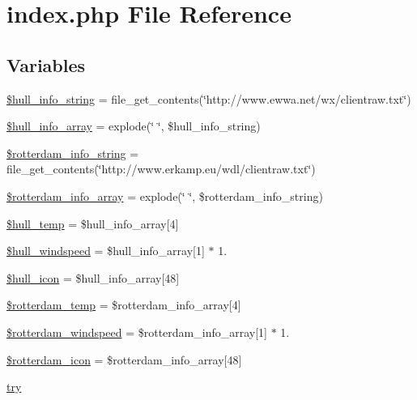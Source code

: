 \hypertarget{index_8php}{}\section{index.\+php File Reference}
\label{index_8php}
\subsection*{Variables}
\begin{DoxyCompactItemize}
\item 
\mbox{\hyperlink{index_8php_a35ce57643e0a8f4a8bb0c194778fb4e9}{\$hull\+\_\+info\+\_\+string}} = file\+\_\+get\+\_\+contents(\char`\"{}http\+://www.\+ewwa.\+net/wx/clientraw.\+txt\char`\"{})
\item 
\mbox{\hyperlink{index_8php_a22d0d905fd4a2f3daae7d36a5527a775}{\$hull\+\_\+info\+\_\+array}} = explode(\char`\"{} \char`\"{}, \$hull\+\_\+info\+\_\+string)
\item 
\mbox{\hyperlink{index_8php_ab3e2cf8e37214ce4445068e865eaf9bd}{\$rotterdam\+\_\+info\+\_\+string}} = file\+\_\+get\+\_\+contents(\char`\"{}http\+://www.\+erkamp.\+eu/wdl/clientraw.\+txt\char`\"{})
\item 
\mbox{\hyperlink{index_8php_a8473f658dba1c3a098692c77a1d5d8b4}{\$rotterdam\+\_\+info\+\_\+array}} = explode(\char`\"{} \char`\"{}, \$rotterdam\+\_\+info\+\_\+string)
\item 
\mbox{\hyperlink{index_8php_a0e5fa38b5556b79fc1dedc0611a0ac43}{\$hull\+\_\+temp}} = \$hull\+\_\+info\+\_\+array\mbox{[}4\mbox{]}
\item 
\mbox{\hyperlink{index_8php_a157ea9ca0609284bf0acb10039e57ece}{\$hull\+\_\+windspeed}} = \$hull\+\_\+info\+\_\+array\mbox{[}1\mbox{]} $\ast$ 1.
\item 
\mbox{\hyperlink{index_8php_a21259db6d85456f627a1b906d8def681}{\$hull\+\_\+icon}} = \$hull\+\_\+info\+\_\+array\mbox{[}48\mbox{]}
\item 
\mbox{\hyperlink{index_8php_a69306471bd59260ad04b5df5ba77803b}{\$rotterdam\+\_\+temp}} = \$rotterdam\+\_\+info\+\_\+array\mbox{[}4\mbox{]}
\item 
\mbox{\hyperlink{index_8php_a9e1bd1fab9ba49731a47922e12661ef5}{\$rotterdam\+\_\+windspeed}} = \$rotterdam\+\_\+info\+\_\+array\mbox{[}1\mbox{]} $\ast$ 1.
\item 
\mbox{\hyperlink{index_8php_a917dfb18ffe5dce2f66b78a2ab25bb2e}{\$rotterdam\+\_\+icon}} = \$rotterdam\+\_\+info\+\_\+array\mbox{[}48\mbox{]}
\item 
\mbox{\hyperlink{index_8php_a3d12b343d049cdea93240f06b0e8467c}{try}}

\end{DoxyCompactItemize}
